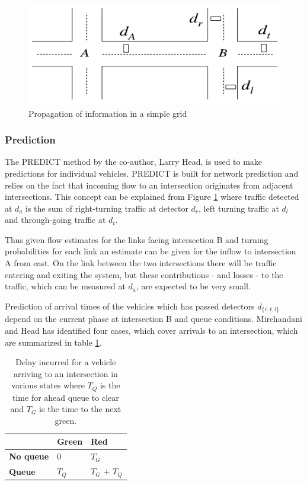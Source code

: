 \begin{figure}[!ht]
\begin{center}
\includegraphics[scale=0.5]{rhodes_prediction-strategy.png} 
\end{center}
\caption{Propagation of information in a simple grid}
\label{fig:rhodes_predict}
\end{figure}

\subsubsection*{Prediction}
The PREDICT method \cite{PREDICT} by the co-author, Larry Head, is used to make
predictions for individual vehicles. PREDICT is built for network
prediction and relies on the fact that incoming flow to an
intersection originates from adjacent intersections. This concept can
be explained from Figure \ref{fig:rhodes_predict} where traffic
detected at $d_a$ is the sum of right-turning traffic at detector
$d_r$, left turning traffic at $d_l$ and through-going traffic at
$d_t$.

Thus given flow estimates for the links facing intersection B and
turning probabilities for each link an estimate can be given for the
inflow to intersection A from east. On the link between the two
intersections there will be traffic entering and exiting the system,
but these contributions - and losses - to the traffic, which can be
measured at $d_a$, are expected to be very small.

Prediction of arrival times of the vehicles which has passed detectors
$d_{\lbrace r,t,l \rbrace}$ depend on the current phase at
intersection B and queue conditions. Mirchandani and Head has
identified four cases, which cover arrivals to an intersection, which
are summarized in table \ref{tbl:delaycases}.

\begin{table}[!ht]
\begin{center}
\begin{tabular}{l|ll}
 & \textbf{Green} & \textbf{Red} \\ \hline
\textbf{No queue} & 0 & $T_G$ \\
\textbf{Queue} & $T_Q$ & $T_G$ + $T_Q$
\end{tabular}
\end{center}
\caption{Delay incurred for a vehicle arriving to an intersection in various states where $T_Q$ is the time for ahead queue to clear and $T_G$ is the time to the next green.}
\label{tbl:delaycases}
\end{table}


